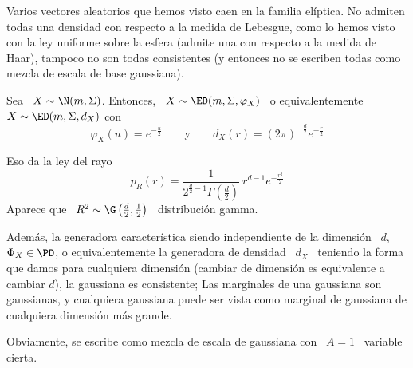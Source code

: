 Varios vectores  aleatorios que hemos visto  caen en la  familia el\'iptica.  No
admiten todas una  densidad con respecto a la medida de  Lebesgue, como lo hemos
visto con la ley  uniforme sobre la esfera (admite una con  respecto a la medida
de Haar),  tampoco no son  todas consistentes (y  entonces no se  escriben todas
como mezcla de escala de base gaussiana).
%
\begin{ejemplo}
%
  Sea \ $X \sim \N(m,\Sigma)$.  Entonces, \ $X \sim \ED(m,\Sigma,\varphi_X)$ \ o
  equivalentemente \ $X \sim \ED(m,\Sigma,d_X)$ con
  \[
  \varphi_X(u)   =  e^{-\frac{u}{2}}   \qquad  \mbox{y}   \qquad  d_X(r)   =  (2
  \pi)^{-\frac{d}{2}} e^{- \frac{r}{2}}
  \]
  
  Eso da la ley del rayo
  \[
  p_R(r)  =  \frac{1}{2^{\frac{d}{2}-1}  \Gamma\left(  \frac{d}{2}  \right)}  \:
  r^{d-1} e^{- \frac{r^2}{2}}
  \]
  Aparece   que  \   $R^2  \sim   \G\left(  \frac{d}{2}   ,   \frac12\right)$  \
  distribuci\'on gamma.
  
  Adem\'as,   la  generadora   caracter\'istica  siendo   independiente   de  la
  dimensi\'on \  $d$, \  $\Phi_X \in \PD$,  o equivalentemente la  generadora de
  densidad  \ $d_X$ \  teniendo la  forma que  damos para  cualquiera dimensi\'on
  (cambiar  de  dimensi\'on es  equivalente  a  cambiar  $d$), la  gaussiana  es
  consistente;  Las marginales  de  una gaussiana  son  gaussianas, y  cualquiera
  gaussiana puede ser vista como  marginal de gaussiana de cualquiera dimensi\'on
  m\'as grande.

  Obviamente, se  escribe como mezcla  de escala  de gaussiana con  \ $A =  1$ \
  variable cierta.
\end{ejemplo}

